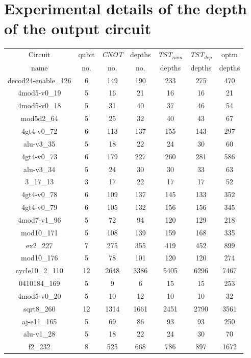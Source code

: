 \documentclass[runningheads]{llncs}
\begin{document}
\section{Experimental details of the depth of the output circuit}
					\begin{table}[H]
						\begin{center}  
						\begin{tabular}{|c|c|c|c|c|c|c|}
						\hline
						Circuit &  qubit  & \textit{CNOT} &depths &\textit{TST$_{num}$}& \textit{TST$_{dep}$}  & optm 	  	\\
						 name	&   no. 	&	no. & no. & depths&  depths &  depths 	\\
						\hline
						decod24-enable\_126 & 6 & 149 & 190 & 233 & 275 & 470 \\
4mod5-v0\_19 & 5 & 16 & 21 & 16 & 16 & 21 \\
4mod5-v0\_18 & 5 & 31 & 40 & 37 & 46 & 54 \\
mod5d2\_64 & 5 & 25 & 32 & 40 & 43 & 67 \\
4gt4-v0\_72 & 6 & 113 & 137 & 155 & 143 & 297 \\
alu-v3\_35 & 5 & 18 & 22 & 24 & 30 & 60 \\
4gt4-v0\_73 & 6 & 179 & 227 & 260 & 281 & 586 \\
alu-v3\_34 & 5 & 24 & 30 & 30 & 33 & 63 \\
3\_17\_13 & 3 & 17 & 22 & 17 & 17 & 52 \\
4gt4-v0\_78 & 6 & 109 & 137 & 145 & 133 & 352 \\
4gt4-v0\_79 & 6 & 105 & 132 & 156 & 156 & 345 \\
4mod7-v1\_96 & 5 & 72 & 94 & 120 & 129 & 218 \\
mod10\_171 & 5 & 108 & 139 & 159 & 168 & 335 \\
ex2\_227 & 7 & 275 & 355 & 419 & 452 & 899 \\
mod10\_176 & 5 & 78 & 101 & 120 & 120 & 274 \\
cycle10\_2\_110 & 12 & 2648 & 3386 & 5405 & 6296 & 7467 \\
0410184\_169 & 5 & 9 & 6 & 15 & 15 & 253 \\
4mod5-v0\_20 & 5 & 10 & 12 & 10 & 10 & 32 \\
sqrt8\_260 & 12 & 1314 & 1661 & 2451 & 2790 & 3561 \\
aj-e11\_165 & 5 & 69 & 86 & 93 & 93 & 250 \\
alu-v1\_28 & 5 & 18 & 22 & 24 & 30 & 70 \\
f2\_232 & 8 & 525 & 668 & 786 & 897 & 1672 \\

\end{tabular}
\end{center}
\end{table}
\end{document}
